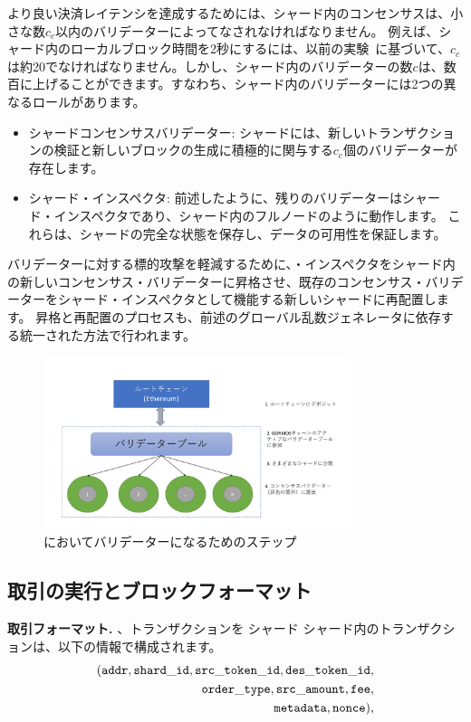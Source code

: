 より良い決済レイテンシを達成するためには、シャード内のコンセンサスは、小さな数$c_c$以内のバリデーターによってなされなければなりません。 例えば、シャード内のローカルブロック時間を2秒にするには、以前の実験~\cite{elastico}に基づいて、$c_c$は約20でなければなりません。しかし、シャード内のバリデーターの数$c$は、数百に上げることができます。すなわち、シャード内のバリデーターには2つの異なるロールがあります。

\begin{itemize}
\item シャードコンセンサスバリデーター: シャードには、新しいトランザクションの検証と新しいブロックの生成に積極的に関与する$c_c$個のバリデーターが存在します。
\item シャード・インスペクタ: 前述したように、残りのバリデーターはシャード・インスペクタであり、シャード内のフルノードのように動作します。 これらは、シャードの完全な状態を保存し、データの可用性を保証します。
\end{itemize}

バリデーターに対する標的攻撃を軽減するために、・インスペクタをシャード内の新しいコンセンサス・バリデーターに昇格させ、既存のコンセンサス・バリデーターをシャード・インスペクタとして機能する新しいシャードに再配置します。 昇格と再配置のプロセスも、前述のグローバル乱数ジェネレータに依存する統一された方法で行われます。

\begin{figure}[t]
  \centering
  \includegraphics[width=0.8\textwidth]{images/validator}
  \caption{\codename においてバリデーターになるためのステップ}
  \label{fig:validator}
\end{figure}

\subsection{取引の実行とブロックフォーマット}

\textbf{取引フォーマット.} 、トランザクションを
シャード シャード内のトランザクションは、以下の情報で構成されます。
\begin{align*}
({\mathtt{addr}}, {\mathtt{shard\_id}}, {\mathtt{src\_token\_id}}, {\mathtt{des\_token\_id}}, \\ {\mathtt{order\_type}}, {\mathtt{src\_amount}}, {\mathtt{fee}}, \\ {\mathtt{metadata}}, {\mathtt{nonce}}),
\end{align*}

